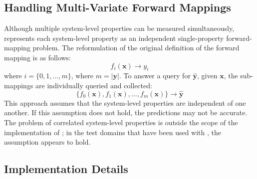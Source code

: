 \subsection{Handling Multi-Variate Forward Mappings}

Although multiple system-level properties can be measured simultaneously,
\fw represents each system-level property as an independent single-property forward-mapping problem.
The reformulation of the original definition of the forward mapping is as follows:
\[ f_i(\mathbf x) \rightarrow y_i \]
where $i = \{0, 1, \ldots, m\}$, where $m = |\mathbf y|$.
To answer a  query for $\hat{\mathbf y}$, given $\mathbf x$, the sub-mappings are individually queried and collected:
\[ \{f_0(\mathbf x), f_1(\mathbf x), \ldots, f_{m}(\mathbf x)\} \rightarrow \hat{\mathbf y} \]
This approach assumes that the system-level properties are independent of one another.
If this assumption does not hold, the predictions may not be accurate.
The problem of correlated system-level properties is outside the scope of the implementation of \fw; in the test domains that have been used with \fw, the assumption appears to hold.




\subsection{Implementation Details}

